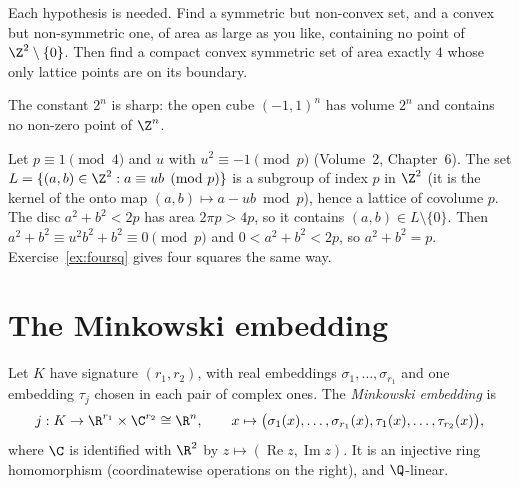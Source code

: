 \begin{think}
Each hypothesis is needed. Find a symmetric but non-convex set, and a convex but non-symmetric one, of area as large
as you like, containing no point of $\Z^2\setminus\{0\}$. Then find a compact convex symmetric set of area exactly $4$
whose only lattice points are on its boundary.
\end{think}

The constant $2^n$ is sharp: the open cube $(-1,1)^n$ has volume $2^n$ and contains no non-zero point of $\Z^n$.

\begin{example}\label{exa:twosq}
Let $p\equiv1\pmod 4$ and $u$ with $u^2\equiv-1\pmod p$ (Volume~2, Chapter~6). The set $L=\{(a,b)\in\Z^2:a\equiv ub\pmod p\}$
is a subgroup of index $p$ in $\Z^2$ (it is the kernel of the onto map $(a,b)\mapsto a-ub\bmod p$), hence a lattice of
covolume $p$. The disc $a^2+b^2<2p$ has area $2\pi p>4p$, so it contains $(a,b)\in L\setminus\{0\}$. Then $a^2+b^2\equiv
u^2b^2+b^2\equiv0\pmod p$ and $0<a^2+b^2<2p$, so $a^2+b^2=p$. Exercise~\ref{ex:foursq} gives four squares the same way.
\end{example}

\section{The Minkowski embedding}

Let $K$ have signature $(r_1,r_2)$, with real embeddings $\sigma_1,\dots,\sigma_{r_1}$ and one embedding $\tau_j$ chosen
in each pair of complex ones. The \emph{Minkowski embedding} is
\[
j:K\to\R^{r_1}\times\C^{r_2}\cong\R^n,\qquad x\mapsto\bigl(\sigma_1(x),\dots,\sigma_{r_1}(x),\tau_1(x),\dots,
\tau_{r_2}(x)\bigr),
\]
where $\C$ is identified with $\R^2$ by $z\mapsto(\operatorname{Re}z,\operatorname{Im}z)$. It is an injective ring
homomorphism (coordinatewise operations on the right), and $\Q$-linear.

